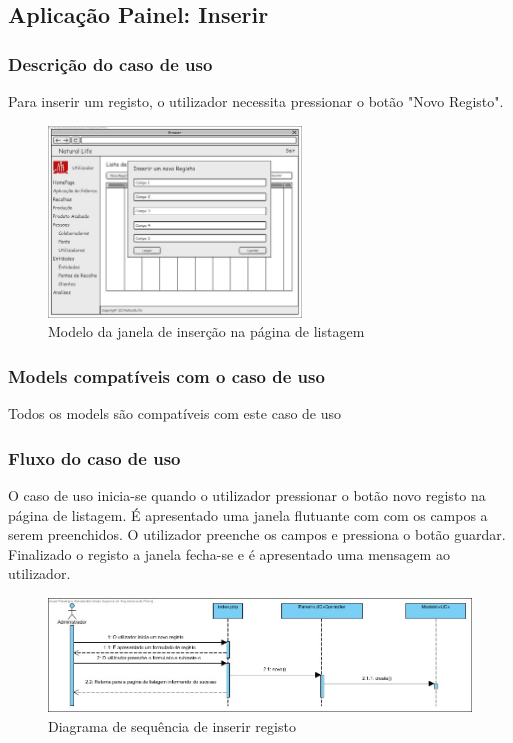 \subsection{Aplicação Painel: Inserir}
\subsubsection*{Descrição do caso de uso}
Para inserir um registo, o utilizador necessita pressionar o botão "Novo Registo". 

\begin{figure}[H] 
	\begin{center}
		\includegraphics[width=0.60\textwidth,keepaspectratio]{figuras/Diagramas_vp/DI_Painel_2_Inserir.jpg}
		\caption{Modelo da janela de inserção na página de listagem}
		\label{fig:di_novo} 
	\end{center}
\end{figure}

\subsubsection*{Models compatíveis com o caso de uso}
Todos os models são compatíveis com este caso de uso

\subsubsection*{Fluxo do caso de uso}
O caso de uso inicia-se quando o utilizador pressionar o botão novo registo na página de listagem. É apresentado uma janela flutuante com com os campos a serem preenchidos. O utilizador preenche os campos e pressiona o botão guardar. Finalizado o registo a janela fecha-se e é apresentado uma mensagem ao utilizador.


\begin{figure}[H] 
	\begin{center}
		\includegraphics[width=\textwidth,keepaspectratio]{figuras/Diagramas_vp/SD_Painel_2_Inserir.jpg}
		\caption{Diagrama de sequência de inserir registo}
		\label{fig:sd_novo} 
	\end{center}
\end{figure}